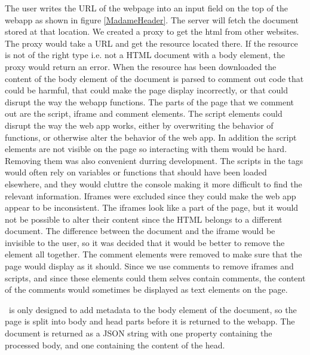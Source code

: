 The user writes the URL of the webpage into an input field on the top of the webapp as shown in figure \ref{MadameHeader}.
The server will fetch the document stored at that location.
We created a proxy to get the html from other websites.
The proxy would take a URL and get the resource located there.
If the resource is not of the right type i.e. not a HTML document with a body element,
the proxy would return an error.
When the resource has been downloaded the content of the body element of the document is parsed to comment out code that
could be harmful, that could make the page display incorrectly, or that could disrupt the way the webapp functions.
The parts of the page that we comment out are the script, iframe and comment elements.
The script elements could disrupt the way the web app works, either by overwriting the behavior of functions,
or otherwise alter the behavior of the web app.
In addition the script elements are not visible on the page so interacting with them would be hard.
Removing them was also convenient durring development.
The scripts in the tags would often rely on variables or functions that should have been loaded elsewhere,
and they would cluttre the console making it more difficult to find the relevant information.
Iframes were excluded since they could make the web app appear to be inconsistent.
The iframes look like a part of the page,
but it would not be possible to alter their content since the HTML belongs to a different document.
The difference between the document and the iframe would be invisible to the user,
so it was decided that it would be better to remove the element all together.
The comment elements were removed to make sure that the page would display as it should.
Since we use comments to remove iframes and scripts, and since these elements could them selves contain comments,
the content of the comments would sometimes be displayed as text elements on the page.

\Theartefact\ is only designed to add metadata to the body element of the document,
so the page is split into body and head parts before it is returned to the webapp.
The document is returned as a JSON string with one property containing the processed body,
and one containing the content of the head.


